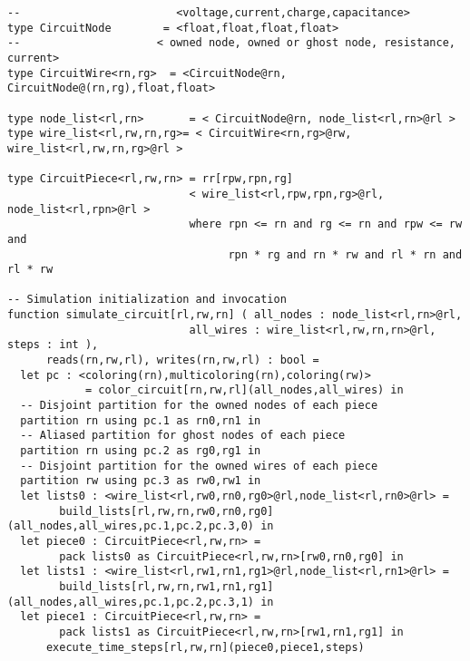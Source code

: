 \begin{lstlisting}[float={t},label={lst:circuit_ex},caption={Circuilt Simulation}]
--                        <voltage,current,charge,capacitance>
type CircuitNode        = <float,float,float,float>
--                     < owned node, owned or ghost node, resistance, current>
type CircuitWire<rn,rg>  = <CircuitNode@rn, CircuitNode@(rn,rg),float,float>

type node_list<rl,rn>       = < CircuitNode@rn, node_list<rl,rn>@rl >
type wire_list<rl,rw,rn,rg>= < CircuitWire<rn,rg>@rw, wire_list<rl,rw,rn,rg>@rl >

type CircuitPiece<rl,rw,rn> = rr[rpw,rpn,rg]
                            < wire_list<rl,rpw,rpn,rg>@rl, node_list<rl,rpn>@rl >         
                            where rpn <= rn and rg <= rn and rpw <= rw and
                                  rpn * rg and rn * rw and rl * rn and rl * rw

-- Simulation initialization and invocation
function simulate_circuit[rl,rw,rn] ( all_nodes : node_list<rl,rn>@rl, 
                            all_wires : wire_list<rl,rw,rn,rn>@rl, steps : int ), 
      reads(rn,rw,rl), writes(rn,rw,rl) : bool = 
  let pc : <coloring(rn),multicoloring(rn),coloring(rw)> 
            = color_circuit[rn,rw,rl](all_nodes,all_wires) in
  -- Disjoint partition for the owned nodes of each piece
  partition rn using pc.1 as rn0,rn1 in
  -- Aliased partition for ghost nodes of each piece
  partition rn using pc.2 as rg0,rg1 in
  -- Disjoint partition for the owned wires of each piece
  partition rw using pc.3 as rw0,rw1 in
  let lists0 : <wire_list<rl,rw0,rn0,rg0>@rl,node_list<rl,rn0>@rl> = 
        build_lists[rl,rw,rn,rw0,rn0,rg0](all_nodes,all_wires,pc.1,pc.2,pc.3,0) in
  let piece0 : CircuitPiece<rl,rw,rn> = 
        pack lists0 as CircuitPiece<rl,rw,rn>[rw0,rn0,rg0] in
  let lists1 : <wire_list<rl,rw1,rn1,rg1>@rl,node_list<rl,rn1>@rl> =
        build_lists[rl,rw,rn,rw1,rn1,rg1](all_nodes,all_wires,pc.1,pc.2,pc.3,1) in
  let piece1 : CircuitPiece<rl,rw,rn> = 
        pack lists1 as CircuitPiece<rl,rw,rn>[rw1,rn1,rg1] in
      execute_time_steps[rl,rw,rn](piece0,piece1,steps)


\end{lstlisting}
